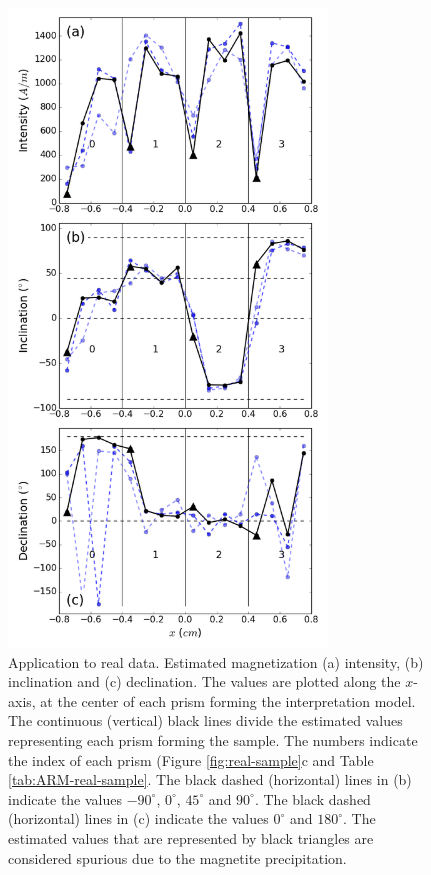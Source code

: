 \documentclass[draft,gc]{agutex}
\begin{document}
 \begin{figure}
 \noindent \includegraphics[width=20pc]{Figs/Fig15_LQ.png}
 \caption{Application to real data. Estimated magnetization 
 (a) intensity, (b) inclination and (c) declination.
 The values are plotted along the $x$-axis, at the center of each 
 prism forming the interpretation model.
 The continuous (vertical) black lines divide the estimated values 
 representing each prism forming the sample.
 The numbers indicate the index of each prism 
 (Figure \ref{fig:real-sample}c and Table \ref{tab:ARM-real-sample}.
 The black dashed (horizontal) lines in (b) indicate the values 
 $-90^{\circ}$, $0^{\circ}$, $45^{\circ}$ and $90^{\circ}$.
 The black dashed (horizontal) lines in (c) indicate the values 
 $0^{\circ}$ and $180^{\circ}$.
 The estimated values that are represented by black triangles are
 considered spurious due to the magnetite precipitation.}
 \label{fig:estimate-real}
 \end{figure}
\end{document}

